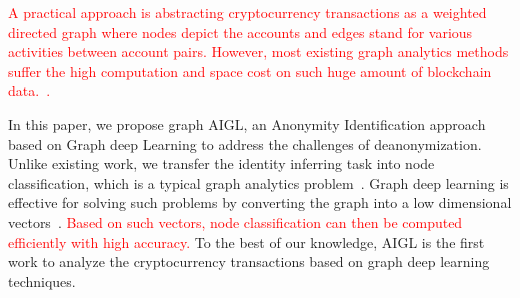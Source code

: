 


\textcolor{red}{A practical approach is abstracting cryptocurrency transactions as a weighted directed graph where nodes depict the accounts and edges stand for various activities between account pairs. However, most existing graph analytics methods suffer the high computation and space cost on such huge amount of blockchain data.~\cite{cai2018comprehensive}.  }

In this paper, we propose graph AIGL, an Anonymity Identification approach based on Graph deep Learning to address the challenges of deanonymization. Unlike existing work, we transfer the identity inferring task into node classification, which is a typical graph analytics problem~\cite{cai2018comprehensive}. Graph deep learning is effective for solving such problems by converting the graph into a low dimensional vectors~\cite{hamilton2017representation,battaglia2018relational}. \textcolor{red}{Based on such vectors, node classification can then be computed efficiently with high accuracy.} To the best of our knowledge, AIGL is the first work to analyze the cryptocurrency transactions based on graph deep learning techniques.

